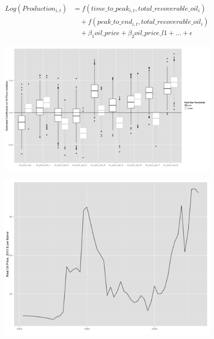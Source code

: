 \documentclass{beamer}
\begin{document}
\begin{frame}[plain]
	\begin{equation}
	\begin{split}
		Log(Production_{i,t})&=f(time\_to\_peak_{i,t}, total\_recoverable\_oil_i) \\
		& \quad + f(peak\_to\_end_{i,t}, total\_recoverable\_oil_i) \\
		& \quad + \beta_1 oil\_price + \beta_2 oil\_price\_l1 + ... +  \epsilon
	\end{split}
	\label{gam_price_eqn}
	\end{equation}
\end{frame}

\begin{frame}
\begin{figure}
	\includegraphics[width=1\textwidth]{figures/gam_price_8_print.png}
	\label{gam_price_8}
\end{figure}
\end{frame}

\begin{frame}
\begin{figure}
	\includegraphics[width=1\textwidth]{figures/oil_price_series.png}
	\label{oil_price_series}	
\end{figure}
\end{frame}
\end{document}
